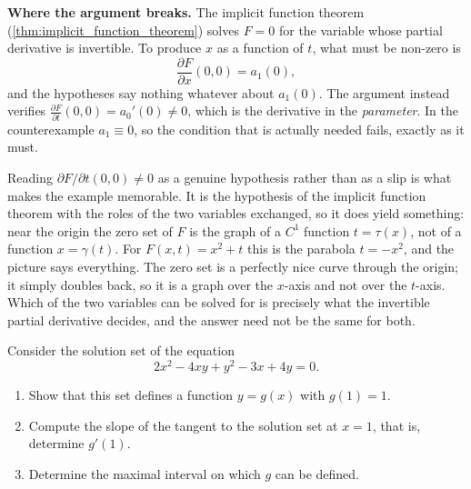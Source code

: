 \begin{example}
\textbf{Where the argument breaks.} The implicit function theorem
(\cref{thm:implicit_function_theorem}) solves $F = 0$ for the variable whose partial derivative is
invertible. To produce $x$ as a function of $t$, what must be non-zero is
\[\frac{\partial F}{\partial x}(0,0) = a_1(0),\]
and the hypotheses say nothing whatever about $a_1(0)$. The argument instead verifies
$\frac{\partial F}{\partial t}(0,0) = a_0'(0) \neq 0$, which is the derivative in the
\emph{parameter}. In the counterexample $a_1 \equiv 0$, so the condition that is actually needed
fails, exactly as it must.

\begin{remark}
Reading $\partial F/\partial t(0,0) \neq 0$ as a genuine hypothesis rather than as a slip is what
makes the example memorable. It is the hypothesis of the implicit function theorem with the roles
of the two variables exchanged, so it does yield something: near the origin the zero set of $F$ is
the graph of a $C^1$ function $t = \tau(x)$, not of a function $x = \gamma(t)$. For $F(x,t) = x^2+t$
this is the parabola $t = -x^2$, and the picture says everything. The zero set is a perfectly nice
curve through the origin; it simply doubles back, so it is a graph over the $x$-axis and not over
the $t$-axis. Which of the two variables can be solved for is precisely what the invertible
partial derivative decides, and the answer need not be the same for both.
\end{remark}
\end{example}

\begin{exercise}
\label{ex:kobel_conic_implicit_maximal_interval}
Consider the solution set of the equation
\[2x^2 - 4xy + y^2 - 3x + 4y = 0.\]
\begin{enumerate}[label=\textbf{(\alph*)}]
  \item Show that this set defines a function $y = g(x)$ with $g(1) = 1$.
  \item Compute the slope of the tangent to the solution set at $x = 1$, that is, determine
    $g'(1)$.
  \item Determine the maximal interval on which $g$ can be defined.
\end{enumerate}
\end{exercise}

